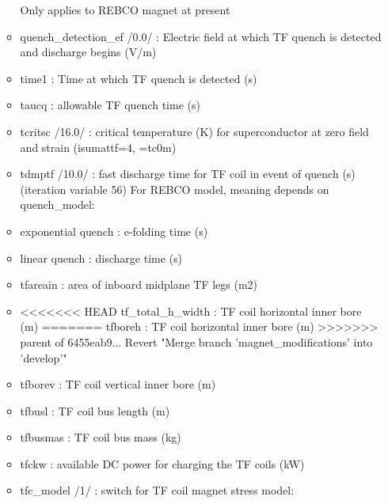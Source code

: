 \documentclass[]{article}
\begin{document}
\begin{itemize}
\begin{itemize}
    Only applies to REBCO magnet at present
  \item
    quench\_detection\_ef /0.0/ : Electric field at which TF quench is
    detected and discharge begins (V/m)
  \item
    time1 : Time at which TF quench is detected (s)
  \item
    taucq : allowable TF quench time (s)
  \item
    tcritsc /16.0/ : critical temperature (K) for superconductor at zero
    field and strain (isumattf=4, =tc0m)
  \item
    tdmptf /10.0/ : fast discharge time for TF coil in event of quench
    (s) (iteration variable 56) For REBCO model, meaning depends on
    quench\_model:
  \item
    exponential quench : e-folding time (s)
  \item
    linear quench : discharge time (s)
  \item
    tfareain : area of inboard midplane TF legs (m2)
  \item
<<<<<<< HEAD
    tf_total_h_width : TF coil horizontal inner bore (m)
=======
    tfboreh : TF coil horizontal inner bore (m)
>>>>>>> parent of 6455eab9... Revert "Merge branch 'magnet_modifications' into 'develop'"
  \item
    tfborev : TF coil vertical inner bore (m)
  \item
    tfbusl : TF coil bus length (m)
  \item
    tfbusmas : TF coil bus mass (kg)
  \item
    tfckw : available DC power for charging the TF coils (kW)
  \item
    tfc\_model /1/ : switch for TF coil magnet stress model:


\end{itemize}
\end{itemize}
\end{document}
